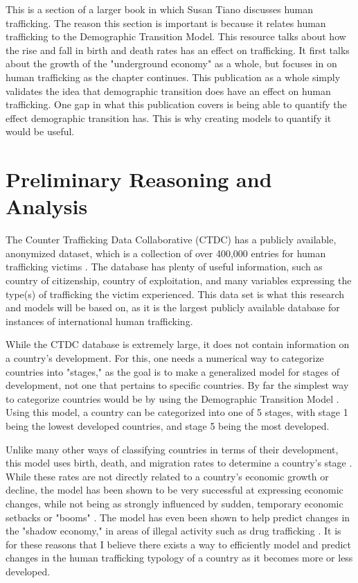 \documentclass{article} %
\begin{document}
This is a section of a larger book in which Susan Tiano discusses human trafficking. The reason this section is important is because it relates human trafficking to the Demographic Transition Model. This resource talks about how the rise and fall in birth and death rates has an effect on trafficking. It first talks about the growth of the "underground economy" as a whole, but focuses in on human trafficking as the chapter continues. This publication as a whole simply validates the idea that demographic transition does have an effect on human trafficking. One gap in what this publication covers is being able to quantify the effect demographic transition has. This is why creating models to quantify it would be useful.

\nocite{SlaveBook}



\section{Preliminary Reasoning and Analysis}

The Counter Trafficking Data Collaborative (CTDC) has a publicly available, anonymized dataset, which is a collection of over 400,000 entries for human trafficking victims \parencite{CTDC}. The database has plenty of useful information, such as country of citizenship, country of exploitation, and many variables expressing the type(s) of trafficking the victim experienced. This data set is what this research and models will be based on, as it is the largest publicly available database for instances of international human trafficking.

While the CTDC database is extremely large, it does not contain information on a country's development. For this, one needs a numerical way to categorize countries into "stages," as the goal is to make a generalized model for stages of development, not one that pertains to specific countries. By far the simplest way to categorize countries would be by using the Demographic Transition Model \parencite{bongaarts2009}. Using this model, a country can be categorized into one of 5 stages, with stage 1 being the lowest developed countries, and stage 5 being the most developed.

Unlike many other ways of classifying countries in terms of their development, this model uses birth, death, and migration rates to determine a country's stage \parencite{bongaarts2009}. While these rates are not directly related to a country's economic growth or decline, the model has been shown to be very successful at expressing economic changes, while not being as strongly influenced by sudden, temporary economic setbacks or "booms" \parencite{kirk1996,bar2010,galor2000}. The model has even been shown to help predict changes in the "shadow economy," in areas of illegal activity such as drug trafficking \parencite{sch1994}. It is for these reasons that I believe there exists a way to efficiently model and predict changes in the human trafficking typology of a country as it becomes more or less developed.
\end{document}
